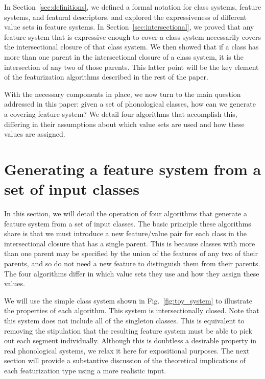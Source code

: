 \documentclass[12pt, oneside]{article}   	%
\begin{document}
In Section~\ref{sec:definitions}, we defined a formal notation for class systems, feature systems, and featural descriptors, and explored the expressiveness of different value sets in feature systems. In Section~\ref{sec:intersectional}, we proved that any feature system that is expressive enough to cover a class system necessarily covers the intersectional closure of that class system. We then showed that if a class has more than one parent in the intersectional closure of a class system, it is the intersection of any two of those parents. This latter point will be the key element of the featurization algorithms described in the rest of the paper.

With the necessary components in place, we now turn to the main question addressed in this paper: given a set of phonological classes, how can we generate a covering feature system? We detail four algorithms that accomplish this, differing in their assumptions about which value sets are used and how these values are assigned.

\FloatBarrier
\section{Generating a feature system from a set of input classes}
\label{sec:algorithm_intro}

In this section, we will detail the operation of four algorithms that generate a feature system from a set of input classes. The basic principle these algorithms share is that we must introduce a new feature/value pair for each class in the intersectional closure that has a single parent. This is because classes with more than one parent may be specified by the union of the features of any two of their parents, and so do not need a new feature to distinguish them from their parents. The four algorithms differ in which value sets they use and how they assign these values.

We will use the simple class system shown in Fig.~\ref{fig:toy_system} to illustrate the properties of each algorithm. This system is intersectionally closed. Note that this system does not include all of the singleton classes. This is equivalent to removing the stipulation that the resulting feature system must be able to pick out each segment individually. Although this is doubtless a desirable property in real phonological systems, we relax it here for expositional purposes. The next section will provide a substantive discussion of the theoretical implications of each featurization type using a more realistic input.
\end{document}
